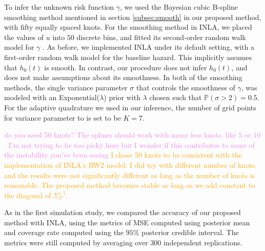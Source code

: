 \documentclass[ba]{imsart}
\newcommand{\alex}[1]{\textcolor{violet}{{ }#1}}
\newcommand{\ziang}[1]{\textcolor{orange}{{ }#1}}
\begin{document}
To infer the unknown risk function $\gamma$, we used the Bayesian cubic B-spline smoothing method mentioned in section \ref{subsec:smooth} in our proposed method, with fifty equally spaced knots. For the smoothing method in INLA, we placed the values of $u$ into $50$ discrete bins, and fitted its second-order random walk model for $\gamma$ \citep{rw2}. As before, we implemented INLA under its default setting, with a first-order random walk model for the baseline hazard. This implicitly assumes that $h_{0}(t)$ is smooth. In contrast, our procedure does not infer $h_{0}(t)$, and does not make assumptions about its smoothness. In both of the smoothing methods, the single variance parameter $\sigma$ that controls the smoothness of $\gamma$, was modeled with an Exponential($\lambda$) prior with $\lambda$ chosen such that $\mathbb{P}\left( \sigma > 2\right) = 0.5$. For the adaptive quadrature we used in our inference, the number of grid points for variance parameter to is set to be $K = 7$.

\alex{do you need 50 knots? The splines should work with many less knots, like $5$ or $10$. I'm not trying to be too picky here but I wonder if this contributes to some of the instability you've been seeing}
\ziang{I chose 50 knots to be consistent with the implementation of INLA's RW2 model. I did try with different number of knots, and the results were not significantly different as long as the number of knots is reasonable. The proposed method becomes stable as long as we add constant to the diagonal of $\Sigma^{-1}_\Gamma$.}


As in the first simulation study, we compared the accuracy of our proposed method with INLA, using the metrics of MSE computed using posterior mean and coverage rate computed using the $95\%$ posterior credible interval. The metrics were still computed by averaging over 300 independent replications.
\end{document}
